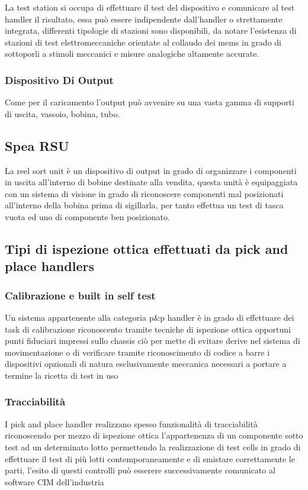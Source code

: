 La test station si occupa di effettuare il test del dispositivo e comunicare al test handler il risultato, essa può essere indipendente dall’handler o strettamente integrata, differenti tipologie di stazioni sono 
disponibili, da notare l’esistenza di stazioni di test elettromeccaniche orientate al collaudo dei mems in 
grado di sottoporli a stimoli meccanici e misure analogiche altamente accurate.  

\subsubsection{Dispositivo Di Output} 

Come per il caricamento l’output può avvenire su una vasta gamma di supporti di uscita, vassoio, bobina, 
tubo. 

\subsection{Spea RSU} 

La reel sort unit è un dispositivo di output in grado di organizzare i componenti in uscita all’interno di 
bobine destinate alla vendita, questa unità è equipaggiata con un sistema di visione in grado di 
riconoscere componenti mal posizionati all’interno della bobina prima di sigillarla, per  tanto effettua un 
test di tasca vuota ed uno di componente ben posizionato. 


\subsection{Tipi di ispezione ottica effettuati da pick and place handlers}
\subsubsection{Calibrazione e built in self test}
Un sistema appartenente alla categoria p\&p handler è in grado di effettuare dei task di calibrazione
riconoscento tramite tecniche di ispezione ottica opportuni punti fiduciari impressi sullo chassis ciò per
mette di evitare derive nel sistema di movimentazione o di verificare tramite riconoscimento di codice a
barre i dispositivi opzionali di natura esclusivamente meccanica necessari a portare a termine la ricetta di
test in uso
\subsubsection{Tracciabilità}
I pick and place handler realizzano spesso funzionalità di tracciabilità riconoscendo per mezzo di
ispezione ottica l’appartenenza di un componente sotto test ad un determinato lotto permettendo la
realizzazione di test cells in grado di effettuare il test di più lotti contemporaneamente e di smistare
correttamente le parti, l’esito di questi controlli può esserere successivamente comunicato al software CIM
dell’industria
